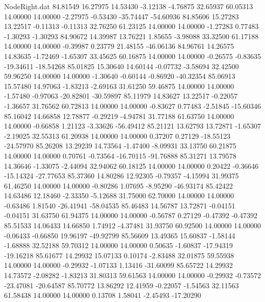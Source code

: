 \begin{filecontents}{NodeRight.dat}
  84.81549   16.27975   14.53430    -3.12138   -4.76875   32.65937   60.05313   14.00000   14.00000   -2.27975   -0.53430  -35.74447  -54.60936
  84.85606   15.27283   13.22517    -0.11313   -0.11313   32.76250   61.23125   14.00000   14.00000   -1.27283    0.77483   -1.30293   -1.30293
  84.90672   14.39987   13.76221     1.85655   -3.98088   33.32500   61.17188   14.00000   14.00000   -0.39987    0.23779   21.48155  -46.06136
  84.96761   14.26575   14.83635    -1.72469   -1.65307   33.45625   60.16875   14.00000   14.00000   -0.26575   -0.83635  -19.34611  -18.54268
  85.01825   15.30640   14.60144    -0.07732   -3.58694   32.42500   59.96250   14.00000   14.00000   -1.30640   -0.60144   -0.86920  -40.32354
  85.06913   15.57480   14.97063    -1.83213   -2.69163   31.61250   59.46875   14.00000   14.00000   -1.57480   -0.97063  -20.82801  -30.59897
  85.11979   14.83627   13.22517    -0.22057   -1.36657   31.76562   60.72813   14.00000   14.00000   -0.83627    0.77483   -2.51845  -15.60346
  85.16042   14.66858   12.78877    -0.29219   -4.94781   31.77188   61.63750   14.00000   14.00000   -0.66858    1.21123   -3.33626  -56.49412
  85.21121   13.62793   13.72871    -1.65307   -2.19025   32.55313   61.20938   14.00000   14.00000    0.37207    0.27129  -18.55123  -24.57970
  85.26208   13.29239   14.73564    -1.47400   -8.09931   33.13750   60.21875   14.00000   14.00000    0.70761   -0.73564  -16.70115  -91.76888
  85.31271   13.79578   14.36646    -1.33075   -2.44094   32.94062   60.18125   14.00000   14.00000    0.20422   -0.36646  -15.14324  -27.77653
  85.37360   14.80286   12.92305    -0.79357   -4.15994   31.99375   61.46250   14.00000   14.00000   -0.80286    1.07695   -8.95290  -46.93174
  85.42422   14.63486   12.18460    -2.33350   -5.12688   31.75000   62.70000   14.00000   14.00000   -0.63486    1.81540  -26.41941  -58.04535
  85.46483   14.56787   13.72871    -0.04151   -0.04151   31.63750   61.94375   14.00000   14.00000   -0.56787    0.27129   -0.47392   -0.47392
  85.51533   14.06433   14.66850     1.74912   -4.37481   31.93750   60.92500   14.00000   14.00000   -0.06433   -0.66850   19.96197  -49.92799
  85.56609   13.49365   15.60837    -1.58144   -1.68888   32.52188   59.70312   14.00000   14.00000    0.50635   -1.60837  -17.94319  -19.16218
  85.61677   14.29932   15.07133     0.10174   -2.83488   32.01875   59.55938   14.00000   14.00000   -0.29932   -1.07133    1.13416  -31.60099
  85.65722   14.29932   14.73572    -2.08282   -1.83213   31.80313   59.61563   14.00000   14.00000   -0.29932   -0.73572  -23.47081  -20.64587
  85.70772   13.86292   12.41959    -0.22057   -1.54563   32.11563   61.58438   14.00000   14.00000    0.13708    1.58041   -2.45493  -17.20290

\end{filecontents}
